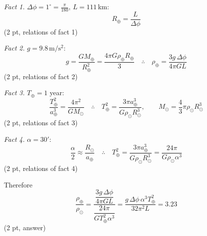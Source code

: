 \emph{Fact 1.} $\Delta\phi = 1^\circ = \frac{\pi}{180}$, $L = 111$\,km:
\[ R_\oplus = \frac{L}{\Delta\phi} \]
\hfill(2 pt, relations of fact 1)

\emph{Fact 2.} $g = 9.8\,\mathrm{m/s^2}$:
\[ g = \frac{GM_\oplus}{R_\oplus^2} = \frac{4\pi G \rho_\oplus R_\oplus}{3}
   \quad\therefore\quad
   \rho_\oplus = \frac{3g\,\Delta\phi}{4\pi G L} \]
\hfill(2 pt, relations of fact 2)

\emph{Fact 3.} $T_\oplus = 1$ year:
\[ \frac{T_\oplus^2}{a_\oplus^3} = \frac{4\pi^2}{GM_\odot}
   \quad\therefore\quad
   T_\oplus^2 = \frac{3\pi a_\oplus^3}{G\rho_\odot R_\odot^3},
   \qquad M_\odot = \frac{4}{3}\pi \rho_\odot R_\odot^3 \]
\hfill(2 pt, relations of fact 3)

\emph{Fact 4.} $\alpha = 30'$:
\[ \frac{\alpha}{2} \approx \frac{R_\odot}{a_\oplus}
   \quad\therefore\quad
   T_\oplus^2 = \frac{3\pi a_\oplus^3}{G\rho_\odot R_\odot^3}
   = \frac{24\pi}{G\rho_\odot \alpha^3} \]
\hfill(2 pt, relations of fact 4)

Therefore
\[ \frac{\rho_\oplus}{\rho_\odot}
   = \frac{\dfrac{3g\,\Delta\phi}{4\pi G L}}{\dfrac{24\pi}{G T_\oplus^2 \alpha^3}}
   = \frac{g\,\Delta\phi\,\alpha^3 T_\oplus^2}{32\pi^2 L} = 3.23 \]
\hfill(2 pt, answer)
